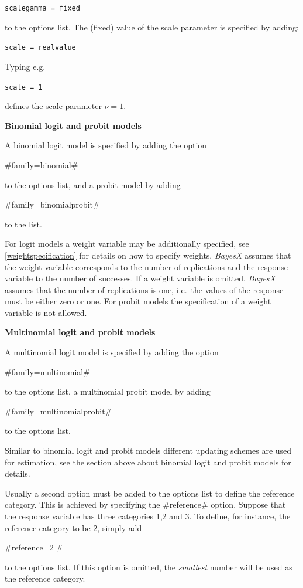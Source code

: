 {\tt scalegamma = fixed}

to the options list. The (fixed) value of the scale parameter is
specified by adding:

{\tt scale = realvalue}

Typing e.g.

{\tt scale = 1}

defines the scale parameter $\nu=1$.


{\bf Binomial logit and probit models}

A binomial logit model is specified by adding the option

#family=binomial#

to the options list, and a probit model by adding

#family=binomialprobit#

to the list.

For logit models a weight variable may be additionally specified,
see \autoref{weightspecification} for details on how to specify
weights. {\em BayesX} assumes that the weight variable corresponds
to the number of replications and the response variable to the
number of successes. If a weight variable is omitted, {\em BayesX}
assumes that the number of replications is one, i.e.~the values of
the response must be either zero or one. For probit models the
specification of a weight variable is not allowed.


{\bf Multinomial logit and probit models}

A multinomial logit model is specified by adding the option

#family=multinomial#

to the options list, a multinomial probit model by adding

#family=multinomialprobit#

to the options list.

Similar to binomial logit and probit models different updating
schemes are used for estimation, see the section above about
binomial logit and probit models for details.

Usually a second option must be added to the options list to
define the reference category. This is achieved by specifying the
#reference# option. Suppose that the response variable has three
categories 1,2 and 3. To define, for instance, the reference
category to be 2, simply add

#reference=2 #

to the options list. If this option is omitted, the {\em smallest}
number will be used as the reference category.

